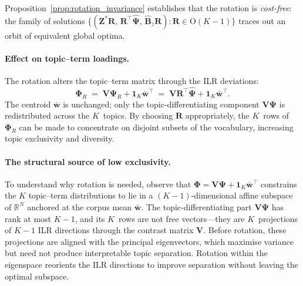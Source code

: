 \documentclass{article}
\begin{document}
\noindent
Proposition~\ref{prop:rotation_invariance} establishes that the
rotation is \emph{cost-free}: the family of solutions
$\{(\mathbf{Z}^*\mathbf{R},\,\mathbf{R}^{\!\top}\hat{\boldsymbol{\Psi}},\,
\hat{\mathbf{B}}_z\mathbf{R}):\mathbf{R}\in\mathrm{O}(K{-}1)\}$ traces
out an orbit of equivalent global optima.
 
\paragraph{Effect on topic--term loadings.}
The rotation alters the topic--term matrix through the ILR deviations:
\begin{equation}
  \boldsymbol{\Phi}_R
  \;=\;
  \mathbf{V}\boldsymbol{\Psi}_R
  + \mathbf{1}_K\bar{\mathbf{w}}^{\!\top}
  \;=\;
  \mathbf{V}\mathbf{R}^{\!\top}\hat{\boldsymbol{\Psi}}
  + \mathbf{1}_K\bar{\mathbf{w}}^{\!\top}.
  \label{eq:Phi_rotated}
\end{equation}
The centroid $\bar{\mathbf{w}}$ is unchanged; only the
topic-differentiating component $\mathbf{V}\boldsymbol{\Psi}$ is
redistributed across the $K$~topics. By choosing $\mathbf{R}$
appropriately, the $K$~rows of $\boldsymbol{\Phi}_R$ can be made to
concentrate on disjoint subsets of the vocabulary, increasing topic
exclusivity and diversity.
 
\paragraph{The structural source of low exclusivity.}
To understand why rotation is needed, observe that
$\boldsymbol{\Phi} = \mathbf{V}\boldsymbol{\Psi}
+ \mathbf{1}_K\bar{\mathbf{w}}^{\!\top}$ constrains
the $K$ topic--term distributions to lie in a $(K{-}1)$-dimensional
affine subspace of $\mathbb{R}^N$ anchored at the corpus mean
$\bar{\mathbf{w}}$. The topic-differentiating part
$\mathbf{V}\boldsymbol{\Psi}$ has rank at most $K{-}1$, and its
$K$~rows are not free vectors---they are
$K$~projections of $K{-}1$ ILR directions through the contrast matrix
$\mathbf{V}$. Before rotation, these projections are aligned with the
principal eigenvectors, which maximise variance but need not produce
interpretable topic separation. Rotation within the eigenspace
reorients the ILR directions to improve separation
without leaving the optimal subspace.
 
\end{document}
